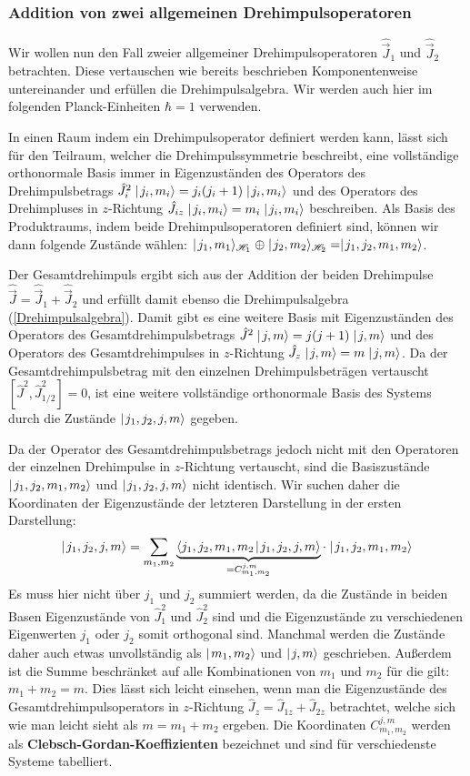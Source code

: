 \subsubsection{Addition von zwei allgemeinen Drehimpulsoperatoren}

Wir wollen nun den Fall zweier allgemeiner Drehimpulsoperatoren $\hat{\vec{J}}_1$ und $\hat{\vec{J}}_2$ betrachten. Diese vertauschen wie bereits beschrieben Komponentenweise untereinander und erfüllen die Drehimpulsalgebra. Wir werden auch hier im folgenden Planck-Einheiten $\hbar=1$ verwenden. 

In einen Raum indem ein Drehimpulsoperator definiert werden kann, lässt sich für den Teilraum, welcher die Drehimpulssymmetrie beschreibt, eine vollständige orthonormale Basis immer in Eigenzuständen des Operators des Drehimpulsbetrags $\hat{J}_i^2\mid\!\!\!\,\,{j_i,m_i}\rangle=j_i(j_i+1)\mid\!\!\!\,\,{j_i,m_i}\rangle$ und des Operators des Drehimpluses in $z$-Richtung $\hat{J}_{iz}\mid\!\!\!\,\,{j_i,m_i}\rangle=m_i\mid\!\!\!\,\,{j_i,m_i}\rangle$ beschreiben. Als Basis des Produktraums, indem beide Drehimpulsoperatoren definiert sind, können wir dann folgende Zustände wählen: $\ket{j_1,m_1}_{\hil_1}\;\oplus\ket{j_2,m_2}_{\hil_2}=\ket{j_1,j_2,m_1,m_2}$. 

Der Gesamtdrehimpuls ergibt sich aus der Addition der beiden Drehimpulse $\hat{\vec{J}}=\hat{\vec{J}}_1+\hat{\vec{J}}_2$ und erfüllt damit ebenso die Drehimpulsalgebra (\ref{Drehimpulsalgebra}). Damit gibt es eine weitere Basis mit Eigenzuständen des Operators des Gesamtdrehimpulsbetrags $\hat{J}^2\mid\!\!\!\,\,{j,m}\rangle=j(j+1)\mid\!\!\!\,\,{j,m}\rangle$ und des Operators des Gesamtdrehimpulses in $z$-Richtung $\hat{J}_z\mid\!\!\!\,\,{j,m}\rangle=m\mid\!\!\!\,\,{j,m}\rangle$. Da der Gesamtdrehimpulsbetrag mit den einzelnen Drehimpulsbeträgen vertauscht $[\hat{J}^2,\hat{J}_{1/2}^2]=0$, ist eine weitere vollständige orthonormale Basis des Systems durch die Zustände $\mid\!\!\!\,\,{j_1,j_2,j,m}\rangle$ gegeben. 

Da der Operator des Gesamtdrehimpulsbetrags jedoch nicht mit den Operatoren der einzelnen Drehimpulse in $z$-Richtung vertauscht, sind die Basiszustände $\mid\!\!\!\,\,{j_1,j_2,m_1,m_2}\rangle$ und $\mid\!\!\!\,\,{j_1,j_2,j,m}\rangle$ nicht identisch. Wir suchen daher die Koordinaten der Eigenzustände der letzteren Darstellung in der ersten Darstellung: 
\begin{eqnarray*}
	\ket{j_1,j_2,j,m} = \sum_{m_1,m_2} \underbrace{\braket{j_1,j_2,m_1,m_2}{j_1,j_2,j,m}}_{=C_{m_1,m_2}^{j,m}}\cdot \ket{j_1,j_2,m_1,m_2} 
\end{eqnarray*}
Es muss hier nicht über $j_1$ und $j_2$ summiert werden, da die Zustände in beiden Basen Eigenzustände von $\hat{J}_1^2$ und $\hat{J}_2^2$ sind und die Eigenzustände zu verschiedenen Eigenwerten $j_1$ oder $j_2$ somit orthogonal sind. Manchmal werden die Zustände daher auch etwas unvollständig als $\mid\!\!\!\,\,{m_1,m_2}\rangle$ und $\mid\!\!\!\,\,{j,m}\rangle$ geschrieben. Außerdem ist die Summe beschränket auf alle Kombinationen von $m_1$ und $m_2$ für die gilt: $m_1+m_2=m$. Dies lässt sich leicht einsehen, wenn man die Eigenzustände des Gesamtdrehimpulsoperators in $z$-Richtung $\hat{J}_z=\hat{J}_{1z}+\hat{J}_{2z}$ betrachtet, welche sich wie man leicht sieht als $m=m_1+m_2$ ergeben. Die Koordinaten $C_{m_1,m_2}^{j,m}$ werden als {\bf Clebsch-Gordan-Koeffizienten} bezeichnet und sind für verschiedenste Systeme tabelliert. 

